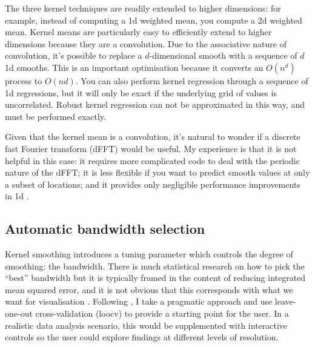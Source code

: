 \documentclass[journal]{vgtc}                %
\begin{document}
The three kernel techniques are readily extended to higher dimensions: for example, instead of computing a 1d weighted mean, you compute a 2d weighted mean. Kernel means are particularly easy to efficiently extend to higher dimensions  because they are a convolution. Due to the associative nature of convolution, it's possible to replace a $d$-dimensional smooth with a sequence of $d$ 1d smooths. This is an important optimisation because it converts an $O(n^d)$ process to $O(nd)$. You can also perform kernel regression through a sequence of 1d regressions, but it will only be exact if the underlying grid of values is uncorrelated. Robust kernel regression can not be approximated in this way, and must be performed exactly.

Given that the kernel mean is a convolution, it's natural to wonder if a discrete fast Fourier transform (dFFT) would be useful. My experience is that it is not helpful in this case: it requires more complicated code to deal with the periodic nature of the dFFT; it is less flexible if you want to predict smooth values at only a subset of locations; and it provides only negligible performance improvements in 1d \citep{wand:1994}.

% 

\subsection{Automatic bandwidth selection}

Kernel smoothing introduces a tuning parameter which controls the degree of smoothing: the bandwidth. There is much statistical research on how to pick the ``best'' bandwidth but it is typically framed in the content of reducing integrated mean squared error, and it is not obvious that this corresponds with what we want for visualisation \citep{denby:2009}. Following \citep{loader:1999}, I take a pragmatic approach and use leave-one-out cross-validation ({\sc loocv}) \citep{efron:1983} to provide a starting point for the user. In a realistic data analysis scenario, this would be supplemented with interactive controls so the user could explore findings at different levels of resolution.
\end{document}
